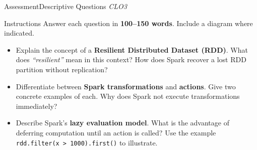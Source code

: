 \documentclass[aspectratio=169,10pt]{beamer}
\begin{document}
\begin{frame}{Assessment\textemdash Descriptive Questions \hfill\small\textit{CLO3}}
  \begin{block}{Instructions}
    Answer each question in \textbf{100--150 words}.  Include a diagram where indicated.
  \end{block}
  \vspace{8pt}
  \begin{itemize}
    \item[\textbf{D1.}] Explain the concept of a \textbf{Resilient Distributed Dataset (RDD)}.  What does \textit{``resilient''} mean in this context?  How does Spark recover a lost RDD partition without replication?
  \end{itemize}
  \vspace{8pt}
  \begin{itemize}
    \item[\textbf{D2.}] Differentiate between \textbf{Spark transformations} and \textbf{actions}.  Give two concrete examples of each.  Why does Spark not execute transformations immediately?
  \end{itemize}
  \vspace{8pt}
  \begin{itemize}
    \item[\textbf{D3.}] Describe Spark's \textbf{lazy evaluation model}.  What is the advantage of deferring computation until an action is called?  Use the example \texttt{rdd.filter(x > 1000).first()} to illustrate.
  \end{itemize}
\end{frame}
\end{document}

